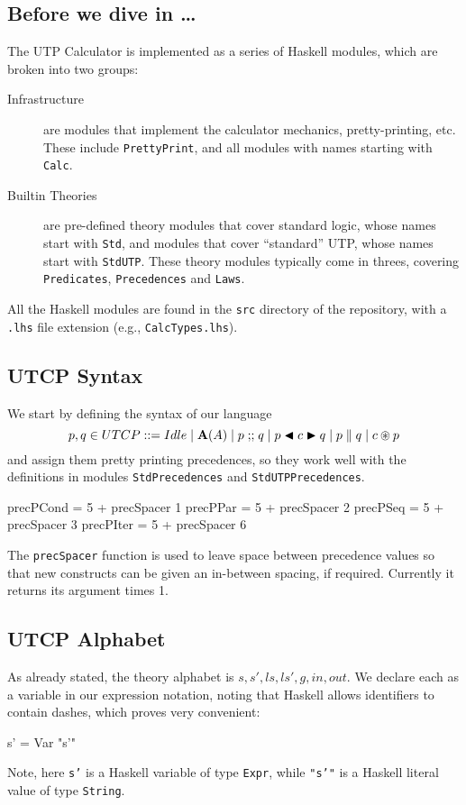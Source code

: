 \subsection{Before we dive in \dots}

The UTP Calculator is implemented as a series
of Haskell modules,
which are broken into two groups:
\begin{description}
  \item[Infrastructure]
    are modules that implement the calculator mechanics,
    pretty-printing, etc.
    These include \texttt{PrettyPrint},
    and all modules with names starting with \texttt{Calc}.
  \item[Builtin Theories]
    are pre-defined theory modules that cover standard logic,
    whose names start with \texttt{Std}, and modules that cover ``standard''
    UTP, whose names start with \texttt{StdUTP}.
    These theory modules typically come in threes, covering
    \texttt{Predicates}, \texttt{Precedences} and \texttt{Laws}.
\end{description}
All the Haskell modules are found in the \texttt{src} directory
of the repository, with a \texttt{.lhs} file extension
(e.g., \texttt{CalcTypes.lhs}).

\subsection{UTCP Syntax}

We start by defining the syntax of our language
\[
   p,q \in UTCP
   ::= Idle
  \mid  \mathbf{A}(A)
  \mid  p \mathrel{\mathbf{;\!;}} q
  \mid  p \mathrel{\blacktriangleleft {c} \blacktriangleright} q
  \mid  p \parallel q
  \mid  c \circledast p
\]
and assign them pretty printing precedences,
so they work well with the definitions in modules
\texttt{StdPrecedences} and \texttt{StdUTPPrecedences}.
\begin{code}
precPCond = 5 + precSpacer  1
precPPar  = 5 + precSpacer  2
precPSeq  = 5 + precSpacer  3
precPIter = 5 + precSpacer  6
\end{code}
The \texttt{precSpacer} function is used to leave space between precedence
values so that new constructs can be given an in-between spacing,
if required. Currently it returns its argument times 1.


\subsection{UTCP Alphabet}

As already stated, the theory alphabet is $s,s',ls,ls',g,in,out$.
We declare each as a variable in our expression notation,
noting that Haskell allows identifiers to contain dashes,
which proves very convenient:
\begin{code}
s' = Var "s'"
\end{code}
Note, here \texttt{s'} is a Haskell variable of type \texttt{Expr},
while \texttt{"s'"} is a Haskell literal value of type \texttt{String}.

